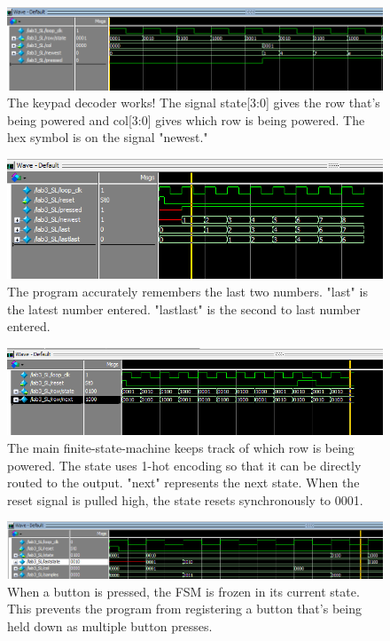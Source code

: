 \documentclass[11pt]{article}
\begin{document}
\begin{figure}[h!]
\centering
\includegraphics[scale=0.54]{keypad_decode.png}
\caption{The keypad decoder works! The signal state[3:0] gives the row that's being powered and col[3:0] gives which row is being powered. The hex symbol is on the signal "newest."}
\label{fig:keypad_decode}
\end{figure} 


\begin{figure}[h!]
\centering
\includegraphics[scale=0.54]{mem.png}
\caption{The program accurately remembers the last two numbers. "last" is the latest number entered. "lastlast" is the second to last number entered.}
\label{fig:mem}
\end{figure} 


\begin{figure}[h!]
\centering
\includegraphics[scale=0.54]{rows.png}
\caption{The main finite-state-machine keeps track of which row is being powered. The state uses 1-hot encoding so that it can be directly routed to the output. "next" represents the next state. When the reset signal is pulled high, the state resets synchronously to 0001.}
\label{fig:states}
\end{figure} 


\begin{figure}[h!]
\centering
\includegraphics[scale=0.54]{state_change_on_button.png}
\caption{When a button is pressed, the FSM is frozen in its current state. This prevents the program from registering a button that's being held down as multiple button presses.}
\label{fig:button_held_down}
\end{figure} 
\end{document}
